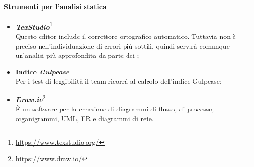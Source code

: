 	\paragraph{Strumenti per l'analisi statica}
	\begin{itemize}
		\item \emph{\textbf{\emph{TexStudio}}}\footnote{\href{https://www.texstudio.org/}{https://www.texstudio.org/}}
		~\\Questo editor include il correttore ortografico automatico. Tuttavia non è preciso nell'individuazione di errori più sottili, quindi servirà comunque un'analisi più approfondita da parte dei \vers;
		\item \textbf{Indice \emph{Gulpease}}
		~\\Per i test di leggibilità il team ricorrà al calcolo dell'indice Gulpease;
		\begin{comment}
		\item 
		\emph{\textbf{\emph{JSHint}}}\ped{G}\footnote{\href{http://jshint.com/}{http://jshint.com/}}
		~\\È uno strumento \emph{OpenSource}\ped{G} funzionale alla rilevazione degli errori e possibili problemi nel codice \emph{JavaScript}\ped{G};
		\item 
		\emph{\textbf{\emph{W3C Markup Validation Service}}}\ped{G}\footnote{\href{https://validator.w3.org/}{https://validator.w3.org/}}
		~\\È uno strumento per la validazione dei documenti \emph{HTML}\ped{G} e \emph{xHTML}\ped{G};
		\end{comment}
		\item 
		\emph{\textbf{\emph{Draw.io}}}\footnote{\href{https://www.draw.io/}{https://www.draw.io/}}
		\\È un software per la creazione di diagrammi di flusso, di processo, organigrammi, UML, ER e diagrammi di rete.
	\end{itemize}
\begin{comment}
	\paragraph{Strumenti per l'analisi dinamica}
	\begin{itemize}
		\item 
		\emph{\textbf{\emph{\textcolor{red}{Karma}}}}\ped{G}\footnote{\href{https://karma-runner.github.io/2.0/index.html}{https://karma-runner.github.io/2.0/index.html}}
		~\\È uno strumento per effettuare test di unità sugli script realizzati, installabile come modulo per \emph{Node.js}\ped{G};
		\item 
		\emph{\textbf{\emph{\textcolor{red}{Mocha}}}}\ped{G}\footnote{\href{https://mochajs.org/}{https://mochajs.org/}}
		~\\È un framework per l'esecuzione dei test asincroni e in serie di Javascript, scritto Node.js.
	\end{itemize}
\end{comment}
